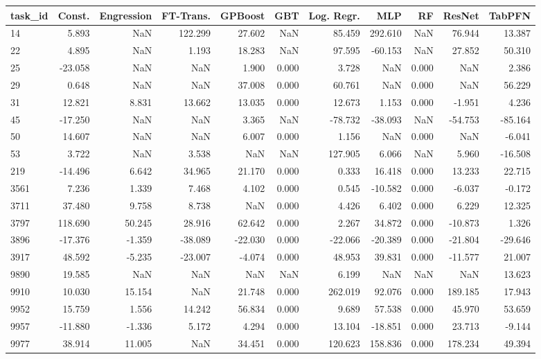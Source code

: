 \begin{tabular}{lrrrrrrrrrr}
\toprule
task\_id & Const. & Engression & FT-Trans. & GPBoost & GBT & Log. Regr. & MLP & RF & ResNet & TabPFN \\
\midrule
14 & 5.893 & NaN & 122.299 & 27.602 & NaN & 85.459 & 292.610 & NaN & 76.944 & 13.387 \\
22 & 4.895 & NaN & 1.193 & 18.283 & NaN & 97.595 & -60.153 & NaN & 27.852 & 50.310 \\
25 & -23.058 & NaN & NaN & 1.900 & 0.000 & 3.728 & NaN & 0.000 & NaN & 2.386 \\
29 & 0.648 & NaN & NaN & 37.008 & 0.000 & 60.761 & NaN & 0.000 & NaN & 56.229 \\
31 & 12.821 & 8.831 & 13.662 & 13.035 & 0.000 & 12.673 & 1.153 & 0.000 & -1.951 & 4.236 \\
45 & -17.250 & NaN & NaN & 3.365 & NaN & -78.732 & -38.093 & NaN & -54.753 & -85.164 \\
50 & 14.607 & NaN & NaN & 6.007 & 0.000 & 1.156 & NaN & 0.000 & NaN & -6.041 \\
53 & 3.722 & NaN & 3.538 & NaN & NaN & 127.905 & 6.066 & NaN & 5.960 & -16.508 \\
219 & -14.496 & 6.642 & 34.965 & 21.170 & 0.000 & 0.333 & 16.418 & 0.000 & 13.233 & 22.715 \\
3561 & 7.236 & 1.339 & 7.468 & 4.102 & 0.000 & 0.545 & -10.582 & 0.000 & -6.037 & -0.172 \\
3711 & 37.480 & 9.758 & 8.738 & NaN & 0.000 & 4.426 & 6.402 & 0.000 & 6.229 & 12.325 \\
3797 & 118.690 & 50.245 & 28.916 & 62.642 & 0.000 & 2.267 & 34.872 & 0.000 & -10.873 & 1.326 \\
3896 & -17.376 & -1.359 & -38.089 & -22.030 & 0.000 & -22.066 & -20.389 & 0.000 & -21.804 & -29.646 \\
3917 & 48.592 & -5.235 & -23.007 & -4.074 & 0.000 & 48.953 & 39.831 & 0.000 & -11.577 & 21.007 \\
9890 & 19.585 & NaN & NaN & NaN & NaN & 6.199 & NaN & NaN & NaN & 13.623 \\
9910 & 10.030 & 15.154 & NaN & 21.748 & 0.000 & 262.019 & 92.076 & 0.000 & 189.185 & 17.943 \\
9952 & 15.759 & 1.556 & 14.242 & 56.834 & 0.000 & 9.689 & 57.538 & 0.000 & 45.970 & 53.659 \\
9957 & -11.880 & -1.336 & 5.172 & 4.294 & 0.000 & 13.104 & -18.851 & 0.000 & 23.713 & -9.144 \\
9977 & 38.914 & 11.005 & NaN & 34.451 & 0.000 & 120.623 & 158.836 & 0.000 & 178.234 & 49.394 \\

\end{tabular}
